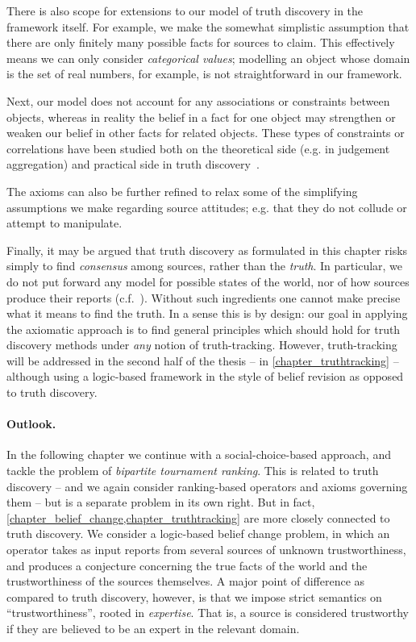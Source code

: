 There is also scope for extensions to our model of truth discovery in the
framework itself. For example, we make the somewhat simplistic assumption that
there are only finitely many possible facts for sources to claim. This
effectively means we can only consider \emph{categorical values}; modelling an
object whose domain is the set of real numbers, for example, is not
straightforward in our framework.

Next, our model does not account for any associations or constraints between
objects, whereas in reality the belief in a fact for one object may strengthen
or weaken our belief in other facts for related objects. These types of
constraints or correlations have been studied both on the theoretical side
(e.g. in judgement aggregation) and practical side in truth
discovery~\cite{yang_probabilistic_2019}.

The axioms can also be further refined to relax some of the simplifying
assumptions we make regarding source attitudes; e.g. that they do not collude
or attempt to manipulate.

Finally, it may be argued that truth discovery as formulated in this chapter
risks simply to find \emph{consensus} among sources, rather than the
\emph{truth}. In particular, we do not put forward any model for possible
states of the world, nor of how sources produce their reports
(c.f.~\cite{meir_proxy_2019}). Without such ingredients one cannot make precise
what it means to find the truth. In a sense this is by design: our goal in
applying the axiomatic approach is to find general principles which should hold
for truth discovery methods under \emph{any} notion of truth-tracking.
However, truth-tracking will be addressed in the second half of the thesis --
in \cref{chapter_truthtracking} -- although using a logic-based framework in
the style of belief revision as opposed to truth discovery.

\paragraph{Outlook.}

In the following chapter we continue with a social-choice-based approach, and
tackle the problem of \emph{bipartite tournament ranking}. This is related to
truth discovery -- and we again consider ranking-based operators and axioms
governing them -- but is a separate problem in its own right.
%
But in fact, \cref{chapter_belief_change,chapter_truthtracking} are more
closely connected to truth discovery. We consider a logic-based belief change
problem, in which an operator takes as input reports from several sources of
unknown trustworthiness, and produces a conjecture concerning the true facts of
the world and the trustworthiness of the sources themselves. A major point of
difference as compared to truth discovery, however, is that we impose strict
semantics on ``trustworthiness'', rooted in \emph{expertise}. That is, a source
is considered trustworthy if they are believed to be an expert in the relevant
domain.
